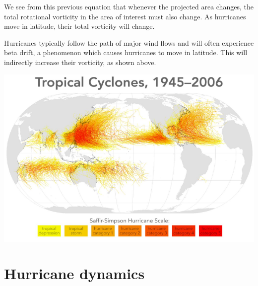 \begin{minipage}{0.49\textwidth}
    We see from this previous equation that whenever the projected area changes, the total rotational vorticity in the area of interest must also change. As hurricanes move in latitude, their total vorticity will change.
    \vspace{1cm}

    Hurricanes typically follow the path of major wind flows and will often experience beta drift, a phenomenon which causes hurricanes to move in latitude. This will indirectly increase their vorticity, as shown above.
    \vspace{2cm}
\end{minipage}\hspace{0.05\textwidth}
\begin{minipage}{0.49\textwidth}
    \begin{center}
        \includegraphics[width=\linewidth]{assets/list.png}
        \label{fig:cyclones}
    \end{center}
\end{minipage}
\section{Hurricane dynamics}

